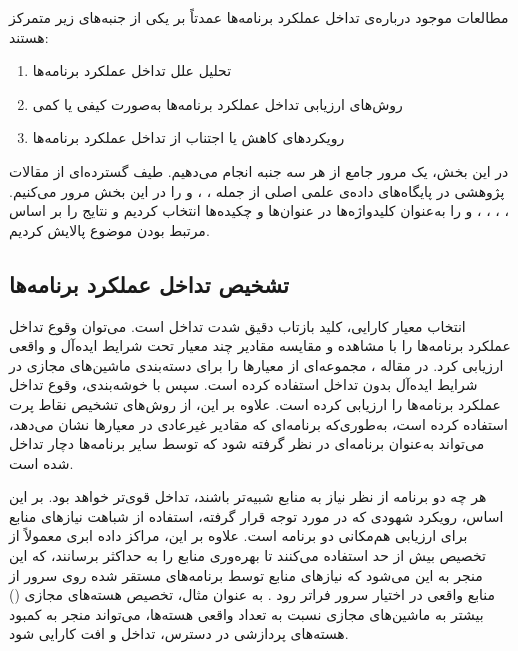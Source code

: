 مطالعات موجود درباره‌ی تداخل عملکرد برنامه‌ها عمدتاً بر یکی از جنبه‌های زیر متمرکز هستند:

\begin{enumerate}
\item
تحلیل علل تداخل عملکرد برنامه‌ها
\item
روش‌های ارزیابی تداخل عملکرد برنامه‌ها به‌صورت کیفی یا کمی
\item
رویکردهای کاهش یا اجتناب از تداخل عملکرد برنامه‌ها
\end{enumerate}

در این بخش، یک مرور جامع از هر سه جنبه انجام می‌دهیم. طیف گسترده‌ای از مقالات پژوهشی در پایگاه‌های داده‌ی علمی اصلی از جمله ، ،  و  را در این بخش مرور می‌کنیم. ، ، ، ،  و  را به‌عنوان کلیدواژه‌ها در عنوان‌ها و چکیده‌ها انتخاب کردیم و نتایج را بر اساس مرتبط بودن موضوع پالایش کردیم.

\subsection{تشخیص تداخل عملکرد برنامه‌ها}

انتخاب معیار کارایی، کلید بازتاب دقیق شدت تداخل است. می‌توان وقوع تداخل عملکرد برنامه‌ها را با مشاهده و مقایسه مقادیر چند معیار تحت شرایط ایده‌آل و واقعی ارزیابی کرد. در مقاله \cite{novakovic2013deepdive}، مجموعه‌ای از معیارها را برای دسته‌بندی ماشین‌های مجازی در شرایط ایده‌آل بدون تداخل استفاده کرده است. سپس با خوشه‌بندی، وقوع تداخل عملکرد برنامه‌ها را ارزیابی کرده است. علاوه بر این، \cite{joshi2017sherlock} از روش‌های تشخیص نقاط پرت استفاده کرده است، به‌طوری‌که برنامه‌ای که مقادیر غیرعادی در معیارها نشان می‌دهد، می‌تواند به‌عنوان برنامه‌ای در نظر گرفته شود که توسط سایر برنامه‌ها دچار تداخل شده است.

هر چه دو برنامه از نظر نیاز به منابع شبیه‌تر باشند، تداخل قوی‌تر خواهد بود. بر این اساس، رویکرد شهودی که در \cite{rahimizadeh2021design} مورد توجه قرار گرفته، ‌استفاده از شباهت نیازهای منابع برای ارزیابی هم‌مکانی دو برنامه است. علاوه بر این، مراکز داده ابری معمولاً از تخصیص بیش از حد استفاده می‌کنند تا بهره‌وری منابع را به حداکثر برسانند، که این منجر به این می‌شود که نیازهای منابع توسط برنامه‌های مستقر شده روی سرور از منابع واقعی در اختیار سرور فراتر رود \cite{lang2016overbooking}. به عنوان مثال، تخصیص هسته‌های مجازی () بیشتر به ماشین‌های مجازی نسبت به تعداد واقعی هسته‌ها، می‌تواند منجر به کمبود هسته‌های پردازشی در دسترس، تداخل و افت کارایی شود.

